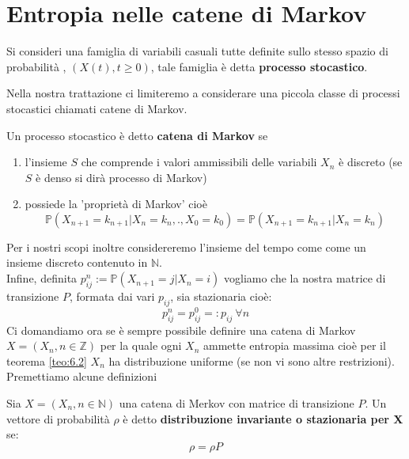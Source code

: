 \vspace{15pt}


\section{Entropia nelle catene di Markov}
\label{sec:markEntropia}
\vspace{10pt}

\begin{defi}
Si consideri una famiglia di variabili casuali tutte definite sullo stesso spazio di probabilità \spacep , $(X(t), t \geq 0 )$, tale famiglia è detta \textbf{processo stocastico}.
\end{defi}
Nella nostra trattazione ci limiteremo a considerare una piccola classe di processi stocastici chiamati catene di Markov.
\begin{defi} \label{defi:cateMarkov}
Un processo stocastico è detto \textbf{catena di Markov} se 
\begin{enumerate}
\item l'insieme $S$ che comprende i valori ammissibili delle variabili $X_n$ è discreto (se $S$ è denso si dirà processo di Markov)
\item possiede la 'proprietà di Markov' cioè
 $$\mathbb{P}(X_{n+1}=k_{n+1}|X_n=k_n,.,X_0=k_0)=\mathbb{P}(X_{n+1}=k_{n+1} | X_n=k_n)$$
\end{enumerate}
\end{defi}
Per i nostri scopi inoltre considereremo l'insieme del tempo come come un insieme discreto contenuto in $\mathbb{N}$.\\
Infine, definita $p_{ij}^n:=\mathbb{P}(X_{n+1}=j|X_n=i)$ vogliamo che la nostra matrice di transizione $P$, formata dai vari $p_{ij}$, sia stazionaria cioè:\\
$$p_{ij}^n=p_{ij}^0=: p_{ij} \  \forall n$$
Ci domandiamo ora se è sempre possibile definire una catena di Markov $X=(X_n,n\in\mathbb{Z})$ per la quale ogni $X_n$ ammette entropia massima cioè per il teorema \ref{teo:6.2} $X_n$ ha distribuzione uniforme (se non vi sono altre restrizioni).
Premettiamo alcune definizioni
\begin{defi}
Sia $X=(X_n, n \in \mathbb{N})$ una catena di Merkov con matrice di transizione $P$. Un vettore di probabilità $\rho$ è detto \textbf{distribuzione invariante o stazionaria per X} se:
$$\rho= \rho P$$
\end{defi}

